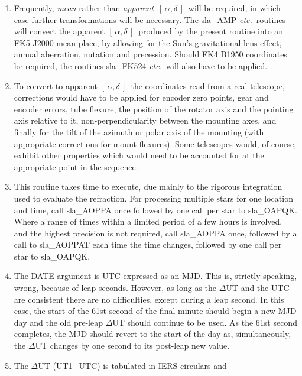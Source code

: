 \documentclass[11pt,twoside]{article}
\newcommand{\radec}     {$[\,\alpha,\delta\,]$}
\begin{document}
{\begin{enumerate}
  \item Frequently, {\it mean}\/ rather than {\it apparent}\,
        \radec\ will be required,
        in which case further transformations will be necessary.  The
        sla\_AMP {\it etc.}\ routines will convert
        the apparent \radec\ produced
        by the present routine into an FK5 J2000 mean place, by
        allowing for the Sun's gravitational lens effect, annual
        aberration, nutation and precession.  Should FK4 B1950
        coordinates be required, the routines sla\_FK524 {\it etc.}\ will also
        have to be applied.
  \item To convert to apparent \radec\ the coordinates read from a
        real telescope, corrections would have to be applied for
        encoder zero points, gear and encoder errors, tube flexure,
        the position of the rotator axis and the pointing axis
        relative to it, non-perpendicularity between the mounting
        axes, and finally for the tilt of the azimuth or polar axis
        of the mounting (with appropriate corrections for mount
        flexures).  Some telescopes would, of course, exhibit other
        properties which would need to be accounted for at the
        appropriate point in the sequence.
  \item This routine takes time to execute, due mainly to the
        rigorous integration used to evaluate the refraction.
        For processing multiple stars for one location and time,
        call sla\_AOPPA once followed by one call per star to sla\_OAPQK.
        Where a range of times within a limited period of a few hours
        is involved, and the highest precision is not required, call
        sla\_AOPPA once, followed by a call to sla\_AOPPAT each time the
        time changes, followed by one call per star to sla\_OAPQK.
  \item The DATE argument is UTC expressed as an MJD.  This is,
        strictly speaking, wrong, because of leap seconds.  However,
        as long as the $\Delta$UT and the UTC are consistent there
        are no difficulties, except during a leap second.  In this
        case, the start of the 61st second of the final minute should
        begin a new MJD day and the old pre-leap $\Delta$UT should
        continue to be used.  As the 61st second completes, the MJD
        should revert to the start of the day as, simultaneously,
        the $\Delta$UT changes by one second to its post-leap new value.
  \item The $\Delta$UT (UT1$-$UTC) is tabulated in IERS circulars and

\end{enumerate}}
\end{document}
